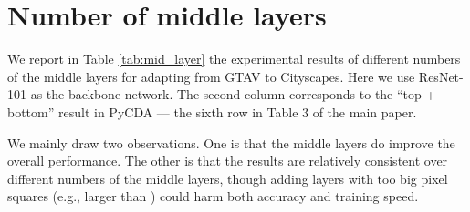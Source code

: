 \documentclass[10pt,twocolumn,letterpaper]{article}
\begin{document}
\setcounter{section}{0}

\section{Number of middle layers}


\setcounter{table}{0}
\renewcommand{\thesection}{\arabic{table}}
\begin{table}[h]
\vspace{-10pt}
\centering
\caption{Results (mIoUs\%) on GTAV to Cityscapes obtained by inserting different middle layers to the  pyramid.}
\label{tab:mid_layer}
\end{table}
\vspace{2mm}
We report in Table \ref{tab:mid_layer} the experimental results of different numbers of the middle layers for adapting from GTAV to Cityscapes. Here we use ResNet-101 as the backbone network. The second column corresponds to the ``top + bottom'' result in PyCDA ---  the sixth row in  Table 3 of the main paper.

We mainly draw two observations. One is that the middle layers do improve the overall performance. The other is that the results are relatively consistent over different numbers of the middle layers, though adding layers with too big pixel squares (e.g., larger than ) could harm both accuracy and training speed.
\end{document}
